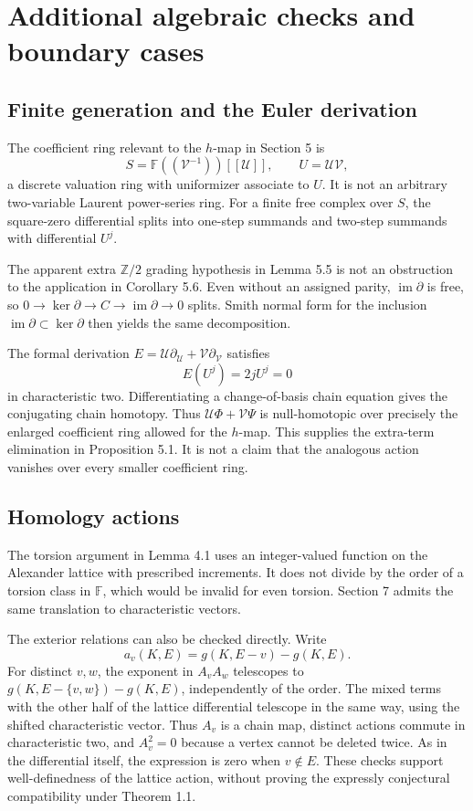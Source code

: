 \documentclass[10pt]{article}
\begin{document}
\section*{Additional algebraic checks and boundary cases}
\subsection*{Finite generation and the Euler derivation}
The coefficient ring relevant to the \(h\)-map in Section 5 is \[S=\mathbb F((\mathcal V^{-1}))[[\mathcal U]],
 \qquad U=\mathcal U\mathcal V,\] a discrete valuation ring with uniformizer associate to \(U\). It is not an arbitrary two-variable Laurent power-series ring. For a finite free complex over \(S\), the square-zero differential splits into one-step summands and two-step summands with differential \(U^j\).\par
The apparent extra \(\mathbb Z/2\) grading hypothesis in Lemma 5.5 is not an obstruction to the application in Corollary 5.6. Even without an assigned parity, \(\operatorname{im}\partial\) is free, so \(0\to\ker\partial\to C\to\operatorname{im}\partial\to0\) splits. Smith normal form for the inclusion \(\operatorname{im}\partial\subset\ker\partial\) then yields the same decomposition.\par
The formal derivation \(E=\mathcal U\partial_{\mathcal U}+\mathcal V\partial_{\mathcal V}\) satisfies \[E(U^j)=2jU^j=0\] in characteristic two. Differentiating a change-of-basis chain equation gives the conjugating chain homotopy. Thus \(\mathcal U\Phi+\mathcal V\Psi\) is null-homotopic over precisely the enlarged coefficient ring allowed for the \(h\)-map. This supplies the extra-term elimination in Proposition 5.1. It is not a claim that the analogous action vanishes over every smaller coefficient ring.\par
\subsection*{Homology actions}
The torsion argument in Lemma 4.1 uses an integer-valued function on the Alexander lattice with prescribed increments. It does not divide by the order of a torsion class in \(\mathbb F\), which would be invalid for even torsion. Section 7 admits the same translation to characteristic vectors.\par
The exterior relations can also be checked directly. Write \[a_v(K,E)=g(K,E-v)-g(K,E).\] For distinct \(v,w\), the exponent in \(A_vA_w\) telescopes to \(g(K,E-\{v,w\})-g(K,E)\), independently of the order. The mixed terms with the other half of the lattice differential telescope in the same way, using the shifted characteristic vector. Thus \(A_v\) is a chain map, distinct actions commute in characteristic two, and \(A_v^2=0\) because a vertex cannot be deleted twice. As in the differential itself, the expression is zero when \(v\notin E\). These checks support well-definedness of the lattice action, without proving the expressly conjectural compatibility under Theorem 1.1.\par
\end{document}
